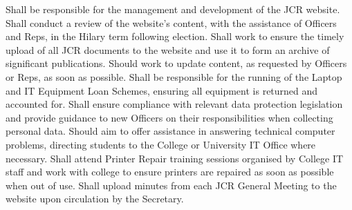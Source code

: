 Shall be responsible for the management and development of the JCR website.
Shall conduct a review of the website's content, with the assistance of Officers and Reps, in the Hilary term following election.
Shall work to ensure the timely upload of all JCR documents to the website and use it to form an archive of significant publications.
Should work to update content, as requested by Officers or Reps, as soon as possible.
Shall be responsible for the running of the Laptop and IT Equipment Loan Schemes, ensuring all equipment is returned and accounted for.
Shall ensure compliance with relevant data protection legislation and provide guidance to new Officers on their responsibilities when collecting personal data.
Should aim to offer assistance in answering technical computer problems, directing students to the College or University IT Office where necessary.
Shall attend Printer Repair training sessions organised by College IT staff and work with college to ensure printers are repaired as soon as possible when out of use.
Shall upload minutes from each JCR General Meeting to the website upon circulation by the Secretary.
